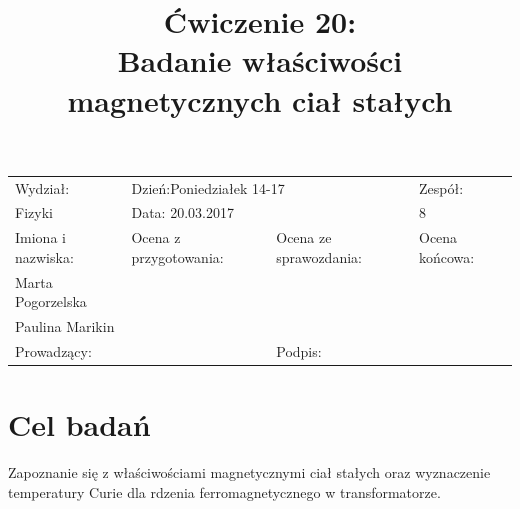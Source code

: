 \documentclass[a4paper,10pt]{article}
\def\arraystretch{1.2}
\begin{document}
\begin{table}
  \centering
  \def\arraystretch{1.5}
    \begin{tabular}{|l|l|l|l|} \hline
    Wydział:           & \multicolumn{2}{l|}{Dzień:Poniedziałek 14-17}    &Zespół:  \\
    Fizyki             &    \multicolumn{2}{l|}{Data: 20.03.2017}         &8             \\\hline
    Imiona i nazwiska: &Ocena z przygotowania:  &Ocena ze sprawozdania:   &Ocena końcowa: \\
    Marta Pogorzelska  &                        &                         &                \\
    Paulina Marikin    &                        &                         &\\\hline
    \multicolumn{2}{|l|}{Prowadzący:                 } &\multicolumn{2}{l|}{Podpis:             }  \\\hline
  \end{tabular}
\end{table}

\title{Ćwiczenie 20:\\Badanie właściwości magnetycznych ciał stałych}
\date{}
\maketitle{}

\section{Cel badań}
Zapoznanie się z właściwościami magnetycznymi ciał stałych oraz wyznaczenie temperatury Curie dla rdzenia ferromagnetycznego w transformatorze.
\end{document}
